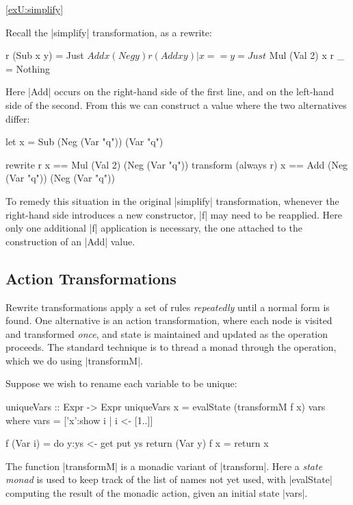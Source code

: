 \begin{examplerevisit}{\ref{exU:simplify}}

Recall the |simplify| transformation, as a rewrite:

\begin{code}
r (Sub x y)           = Just $ Add x (Neg y)
r (Add x y) | x == y  = Just $ Mul (Val 2) x
r _                   = Nothing
\end{code}

Here |Add| occurs on the right-hand side of the first line, and on the left-hand side of the second. From this we can construct a value where the two alternatives differ:

\ignore\begin{code}
let x = Sub (Neg (Var "q")) (Var "q")

rewrite    r           x == Mul (Val 2) (Neg (Var "q"))
transform  (always r)  x == Add (Neg (Var "q")) (Neg (Var "q"))
\end{code}

To remedy this situation in the original |simplify| transformation, whenever the right-hand side introduces a new constructor, |f| may need to be reapplied. Here only one additional |f| application is necessary, the one attached to the construction of an |Add| value.

\codeexample
\end{examplerevisit}


\subsection{Action Transformations}

Rewrite transformations apply a set of rules \textit{repeatedly} until a normal form is found. One alternative is an action transformation, where each node is visited and transformed \textit{once}, and state is maintained and updated as the operation proceeds. The standard technique is to thread a monad through the operation, which we do using |transformM|.

\begin{example}
Suppose we wish to rename each variable to be unique:

\begin{code}
uniqueVars :: Expr -> Expr
uniqueVars x = evalState (transformM f x) vars
    where
        vars = ['x':show i | i <- [1..]]

        f (Var i)  = do  y:ys <- get
                         put ys
                         return (Var y)
        f x        = return x
\end{code}

The function |transformM| is a monadic variant of |transform|. Here a \textit{state monad} is used to keep track of the list of names not yet used, with |evalState| computing the result of the monadic action, given an initial state |vars|.
\end{example}

